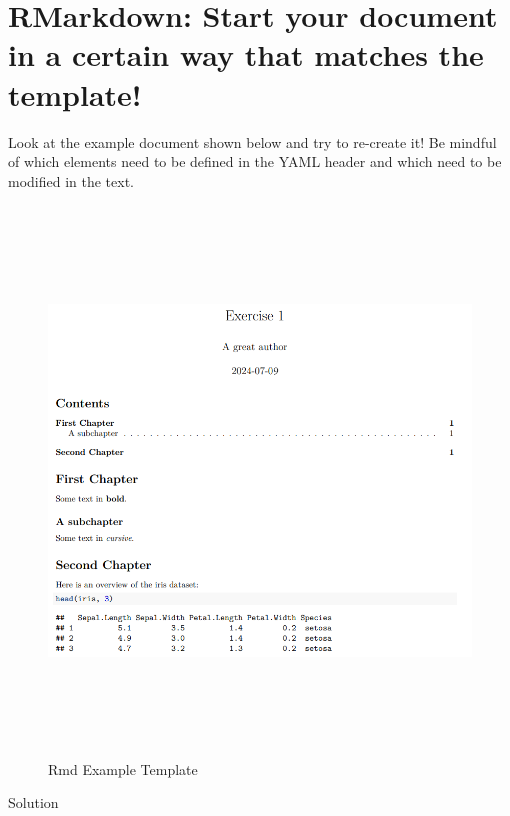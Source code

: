 \documentclass[
]{book}
\begin{document}
\section{RMarkdown: Start your document in a certain way that matches the template!}\label{rmarkdown-start-your-document-in-a-certain-way-that-matches-the-template}

Look at the example document shown below and try to re-create it!
Be mindful of which elements need to be defined in the YAML header and which need to be modified in the text.

\begin{figure}
\centering
\includegraphics[width=\textwidth,height=5.72917in]{./img/Rmd-exc1.png}
\caption{Rmd Example Template}
\end{figure}

Solution
\end{document}
